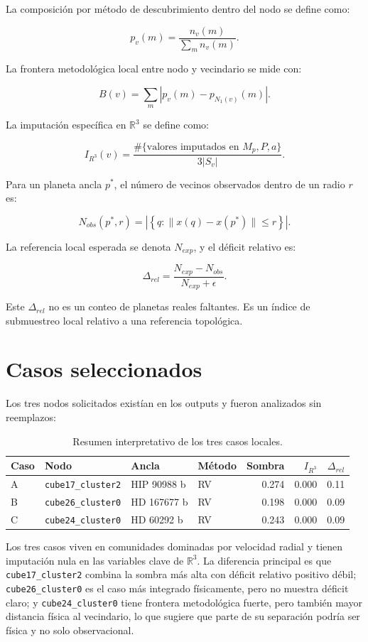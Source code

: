\documentclass[11pt]{article}
\begin{document}
La composición por método de descubrimiento dentro del nodo se define como:

\[
p_v(m)=\frac{n_v(m)}{\sum_m n_v(m)}.
\]

La frontera metodológica local entre nodo y vecindario se mide con:

\[
B(v)=\sum_m |p_v(m)-p_{N_1(v)}(m)|.
\]

La imputación específica en $\mathbb{R}^3$ se define como:

\[
I_{R^3}(v)=
\frac{
\#\{\text{valores imputados en }M_p,P,a\}
}{3|S_v|}.
\]

Para un planeta ancla $p^*$, el número de vecinos observados dentro de un radio $r$ es:

\[
N_{obs}(p^*,r)=
\left|\left\{q:\|x(q)-x(p^*)\|\leq r\right\}\right|.
\]

La referencia local esperada se denota $N_{exp}$, y el déficit relativo es:

\[
\Delta_{rel}=\frac{N_{exp}-N_{obs}}{N_{exp}+\epsilon}.
\]

Este $\Delta_{rel}$ no es un conteo de planetas reales faltantes. Es un índice de submuestreo local relativo a una referencia topológica.

\section{Casos seleccionados}

Los tres nodos solicitados existían en los outputs y fueron analizados sin reemplazos:

\begin{table}[H]
\centering
\caption{Resumen interpretativo de los tres casos locales.}
\label{tab:threecases}
\begin{tabular}{llllrrr}
\toprule
Caso & Nodo & Ancla & Método & Sombra & $I_{R^3}$ & $\Delta_{rel}$ \\
\midrule
A & \texttt{cube17\_cluster2} & HIP 90988 b & RV & 0.274 & 0.000 & 0.11 \\
B & \texttt{cube26\_cluster0} & HD 167677 b & RV & 0.198 & 0.000 & 0.09 \\
C & \texttt{cube24\_cluster0} & HD 60292 b & RV & 0.243 & 0.000 & 0.09 \\
\bottomrule
\end{tabular}
\end{table}

Los tres casos viven en comunidades dominadas por velocidad radial y tienen imputación nula en las variables clave de $\mathbb{R}^3$. La diferencia principal es que \texttt{cube17\_cluster2} combina la sombra más alta con déficit relativo positivo débil; \texttt{cube26\_cluster0} es el caso más integrado físicamente, pero no muestra déficit claro; y \texttt{cube24\_cluster0} tiene frontera metodológica fuerte, pero también mayor distancia física al vecindario, lo que sugiere que parte de su separación podría ser física y no solo observacional.
\end{document}
